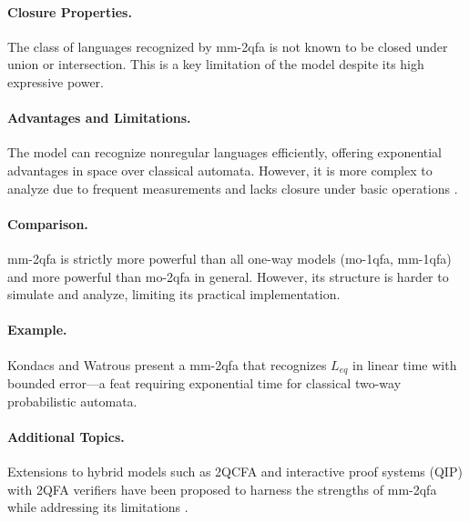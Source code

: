 \paragraph{Closure Properties.} The class of languages recognized by \gls{mm-2qfa} is not known to be closed under union or intersection. This is a key limitation of the model despite its high expressive power.

\paragraph{Advantages and Limitations.} The model can recognize nonregular languages efficiently, offering exponential advantages in space over classical automata. However, it is more complex to analyze due to frequent measurements and lacks closure under basic operations \cite{kondacs1997power, qiu2008state}.

\paragraph{Comparison.} \gls{mm-2qfa} is strictly more powerful than all one-way models (\gls{mo-1qfa}, \gls{mm-1qfa}) and more powerful than \gls{mo-2qfa} in general. However, its structure is harder to simulate and analyze, limiting its practical implementation.

\paragraph{Example.} Kondacs and Watrous \cite{kondacs1997power} present a \gls{mm-2qfa} that recognizes $L_{eq}$ in linear time with bounded error—a feat requiring exponential time for classical two-way probabilistic automata.

\paragraph{Additional Topics.} Extensions to hybrid models such as 2QCFA and interactive proof systems (QIP) with 2QFA verifiers have been proposed to harness the strengths of \gls{mm-2qfa} while addressing its limitations \cite{pani2011empowering, qiu2008state}.

